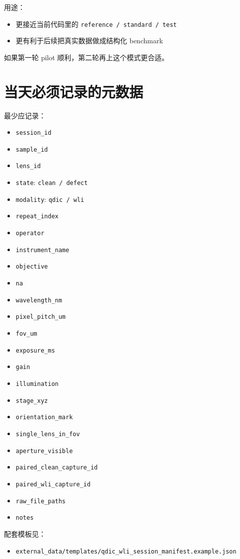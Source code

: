 \documentclass[UTF8,a4paper,11pt]{ctexart}
\newcommand{\Code}[1]{\texttt{#1}}
\begin{document}
用途：
\begin{itemize}
  \item 更接近当前代码里的 \Code{reference / standard / test}
  \item 更有利于后续把真实数据做成结构化 benchmark
\end{itemize}

如果第一轮 pilot 顺利，第二轮再上这个模式更合适。

\section{当天必须记录的元数据}

最少应记录：
\begin{itemize}
  \item \Code{session\_id}
  \item \Code{sample\_id}
  \item \Code{lens\_id}
  \item \Code{state}: \Code{clean / defect}
  \item \Code{modality}: \Code{qdic / wli}
  \item \Code{repeat\_index}
  \item \Code{operator}
  \item \Code{instrument\_name}
  \item \Code{objective}
  \item \Code{na}
  \item \Code{wavelength\_nm}
  \item \Code{pixel\_pitch\_um}
  \item \Code{fov\_um}
  \item \Code{exposure\_ms}
  \item \Code{gain}
  \item \Code{illumination}
  \item \Code{stage\_xyz}
  \item \Code{orientation\_mark}
  \item \Code{single\_lens\_in\_fov}
  \item \Code{aperture\_visible}
  \item \Code{paired\_clean\_capture\_id}
  \item \Code{paired\_wli\_capture\_id}
  \item \Code{raw\_file\_paths}
  \item \Code{notes}
\end{itemize}

配套模板见：
\begin{itemize}
  \item \Code{external\_data/templates/qdic\_wli\_session\_manifest.example.json}
\end{itemize}
\end{document}
